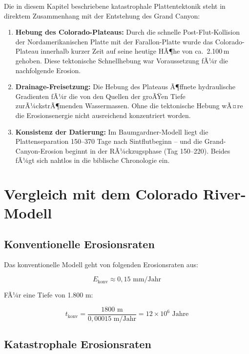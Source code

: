 ﻿\documentclass[12pt,a4paper]{report}
\begin{document}
Die in diesem Kapitel beschriebene katastrophale Plattentektonik steht in direktem Zusammenhang mit der Entstehung des Grand Canyon:

\begin{enumerate}
	\item \textbf{Hebung des Colorado-Plateaus:} Durch die schnelle Post-Flut-Kollision der Nordamerikanischen Platte mit der Farallon-Platte wurde das Colorado-Plateau innerhalb kurzer Zeit auf seine heutige HÃ¶he von ca.\ 2.100\,m gehoben. Diese tektonische Schnellhebung war Voraussetzung fÃ¼r die nachfolgende Erosion.
	\item \textbf{Drainage-Freisetzung:} Die Hebung des Plateaus Ã¶ffnete hydraulische Gradienten fÃ¼r die von den Quellen der groÃŸen Tiefe zurÃ¼ckstrÃ¶menden Wassermassen. Ohne die tektonische Hebung wÃ¤re die Erosionsenergie nicht ausreichend konzentriert worden.
	\item \textbf{Konsistenz der Datierung:} Im Baumgardner-Modell liegt die Plattenseparation 150--370 Tage nach Sintflutbeginn -- und die Grand-Canyon-Erosion beginnt in der RÃ¼ckzugsphase (Tag 150--220). Beides fÃ¼gt sich nahtlos in die biblische Chronologie ein.
\end{enumerate}

\chapter{Vergleich mit dem Colorado River-Modell}

\section{Konventionelle Erosionsraten}

Das konventionelle Modell geht von folgenden Erosionsraten aus:

\begin{equation}
	E_{\text{konv}} \approx 0{,}15 \text{ mm/Jahr}
\end{equation}

FÃ¼r eine Tiefe von 1.800 m:

\begin{equation}
	t_{\text{konv}} = \frac{1800 \text{ m}}{0{,}00015 \text{ m/Jahr}} = 12 \times 10^6 \text{ Jahre}
\end{equation}

\section{Katastrophale Erosionsraten}
\end{document}
